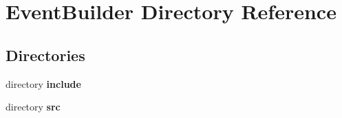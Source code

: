 \section{Event\-Builder Directory Reference}
\label{dir_c9e8b6481212bff52b0f375d541b1b09}
\subsection*{Directories}
\begin{DoxyCompactItemize}
\item 
directory {\bf include}
\item 
directory {\bf src}
\end{DoxyCompactItemize}
